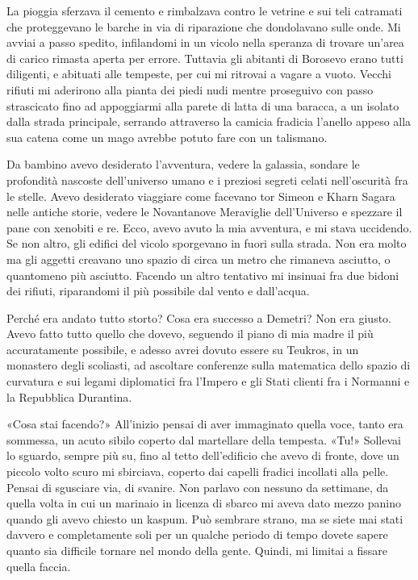La pioggia sferzava il cemento e rimbalzava contro le vetrine e sui teli
catramati che proteggevano le barche in via di riparazione che
dondolavano sulle onde. Mi avviai a passo spedito, infilandomi in un
vicolo nella speranza di trovare un'area di carico rimasta aperta per
errore. Tuttavia gli abitanti di Borosevo erano tutti diligenti, e
abituati alle tempeste, per cui mi ritrovai a vagare a vuoto. Vecchi
rifiuti mi aderirono alla pianta dei piedi nudi mentre proseguivo con
passo strascicato fino ad appoggiarmi alla parete di latta di una
baracca, a un isolato dalla strada principale, serrando attraverso la
camicia fradicia l'anello appeso alla sua catena come un mago avrebbe
potuto fare con un talismano.

Da bambino avevo desiderato l'avventura, vedere la galassia, sondare le
profondità nascoste dell'universo umano e i preziosi segreti celati
nell'oscurità fra le stelle. Avevo desiderato viaggiare come facevano
tor Simeon e Kharn Sagara nelle antiche storie, vedere le Novantanove
Meraviglie dell'Universo e spezzare il pane con xenobiti e re. Ecco,
avevo avuto la mia avventura, e mi stava uccidendo. Se non altro, gli
edifici del vicolo sporgevano in fuori sulla strada. Non era molto ma
gli aggetti creavano uno spazio di circa un metro che rimaneva asciutto,
o quantomeno più asciutto. Facendo un altro tentativo mi insinuai fra
due bidoni dei rifiuti, riparandomi il più possibile dal vento e
dall'acqua.

Perché era andato tutto storto? Cosa era successo a Demetri? Non era
giusto. Avevo fatto tutto quello che dovevo, seguendo il piano di mia
madre il più accuratamente possibile, e adesso avrei dovuto essere su
Teukros, in un monastero degli scoliasti, ad ascoltare conferenze sulla
matematica dello spazio di curvatura e sui legami diplomatici fra
l'Impero e gli Stati clienti fra i Normanni e la Repubblica Durantina.

«Cosa stai facendo?» All'inizio pensai di aver immaginato quella voce,
tanto era sommessa, un acuto sibilo coperto dal martellare della
tempesta. «Tu!» Sollevai lo sguardo, sempre più su, fino al tetto
dell'edificio che avevo di fronte, dove un piccolo volto scuro mi
sbirciava, coperto dai capelli fradici incollati alla pelle. Pensai di
sgusciare via, di svanire. Non parlavo con nessuno da settimane, da
quella volta in cui un marinaio in licenza di sbarco mi aveva dato mezzo
panino quando gli avevo chiesto un kaspum. Può sembrare strano, ma se
siete mai stati davvero e completamente soli per un qualche periodo di
tempo dovete sapere quanto sia difficile tornare nel mondo della gente.
Quindi, mi limitai a fissare quella faccia.

